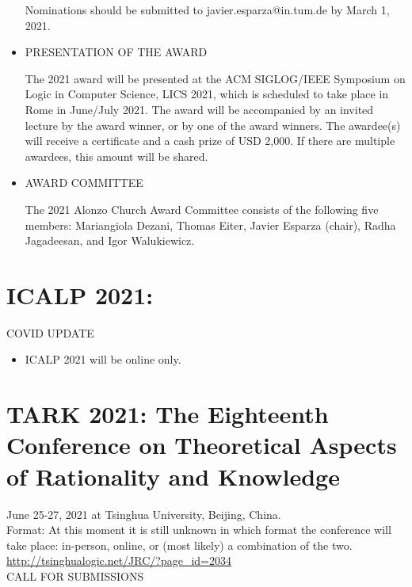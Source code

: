 \documentclass{article}
\begin{document}
\begin{itemize}
  Nominations should be submitted to javier.esparza@in.tum.de by March 1, 2021. 
 
\item  PRESENTATION OF THE AWARD 
 
  The 2021 award will be presented at the ACM SIGLOG/IEEE Symposium on Logic in Computer Science, LICS 2021, which is scheduled to take place in Rome in June/July 2021. The award will be accompanied by an invited lecture by the award winner, or by one of the award winners. The awardee(s) will receive a certificate and a cash prize of USD 2,000. If there are multiple awardees, this amount will be shared. 
 
\item  AWARD COMMITTEE 
 
  The 2021 Alonzo Church Award Committee consists of the following five members: Mariangiola Dezani, Thomas Eiter, Javier Esparza (chair), Radha Jagadeesan, and Igor Walukiewicz. 
 
\end{itemize}\section{ICALP 2021:}\label{ICALP2021}COVID UPDATE 

\begin{itemize}\item  ICALP 2021 will be online only. 
 
\end{itemize}\section{TARK 2021: The Eighteenth Conference on Theoretical Aspects of Rationality and Knowledge}\label{TARK2021}  June 25-27, 2021 at Tsinghua University, Beijing, China.\\ 
  Format: At this moment it is still unknown in which format the conference will take place: in-person, online, or (most likely) a combination of the two.\\ 
  \href{http://tsinghualogic.net/JRC/?page_id=2034}{http://tsinghualogic.net/JRC/?page\_id=2034}\\ 
CALL FOR SUBMISSIONS 
\end{document}
